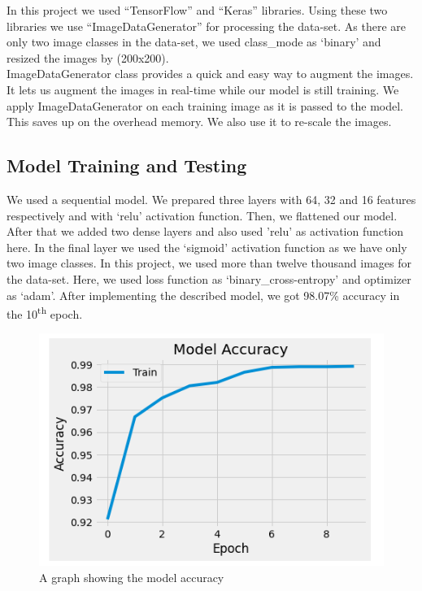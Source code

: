 \documentclass[conference]{IEEEtran}
\begin{document}
In this project we used “TensorFlow” and “Keras” libraries. Using these two libraries we use “ImageDataGenerator” for processing the data-set. As there are only two image classes in the data-set, we used class\_mode as ‘binary’ and resized the images by (200x200).\\

ImageDataGenerator class provides a quick and easy way to augment the images. It lets us augment the images in real-time while our model is still training. We apply ImageDataGenerator on each training image as it is passed to the model. This saves up on the overhead memory. We also use it to re-scale the images. 

\subsection{Model Training and Testing }
We used a sequential model. We prepared three layers with 64, 32 and 16 features respectively and with ‘relu’ activation function. Then, we flattened our model. After that we added two dense layers and also used 'relu' as activation  function here. In the final layer we used the ‘sigmoid’ activation function as we have only two image classes. In this project, we used more than twelve thousand images for the data-set. Here, we used loss function as ‘binary\_cross-entropy’ and optimizer as ‘adam’. After implementing the described model, we got 98.07\% accuracy in the 10\textsuperscript{th} epoch. 
\begin{center}
\begin{figure}[htbp]
  \includegraphics[width=1.0\linewidth]{Accurecy.png}
  \caption{A graph showing the model accuracy}
  \label{fig:fig 3}
\end{figure}
\end{center}
\\
\end{document}
